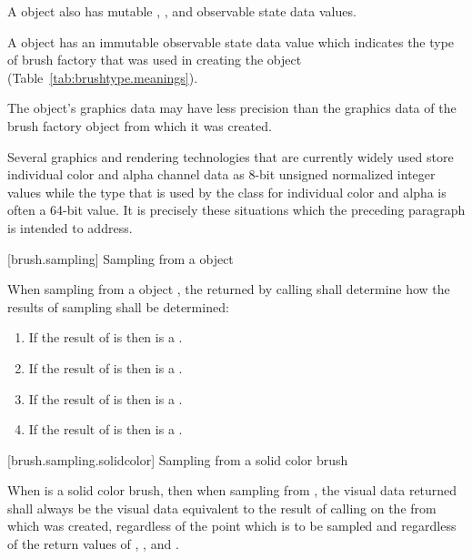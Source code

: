 \pnum
A  object also has mutable , , and  observable state data values.

\pnum
A  object has an immutable  observable state data value which indicates the type of brush factory that was used in creating the  object (Table~\ref{tab:brushtype.meanings}).

\pnum
The  object's graphics data may have less precision than the graphics data of the brush factory object from which it was created.

\pnum
\enterexample
Several graphics and rendering technologies that are currently widely used store individual color and alpha channel data as 8-bit unsigned normalized integer values while the  type that is used by the  class for individual color and alpha is often a 64-bit value. It is precisely these situations which the preceding paragraph is intended to address.
\exitexample

 [brush.sampling] {Sampling from a  object}

\pnum
When sampling from a  object , the  returned by calling  shall determine how the results of sampling shall be determined:
\begin{enumerate}
\item If the result of  is  then  is a .
\item If the result of  is  then  is a .
\item If the result of  is  then  is a .
\item If the result of  is  then  is a .
\end{enumerate}

 [brush.sampling.solidcolor] {Sampling from a solid color brush}

\pnum
When  is a solid color brush, then when sampling from , the visual data returned shall always be the visual data equivalent to the result of calling  on the  from which  was created, regardless of the point which is to be sampled and regardless of the return values of , , and .

